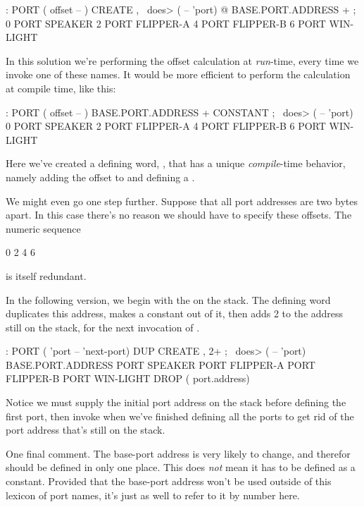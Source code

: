\begin{Code}
: PORT  ( offset -- )  CREATE ,
   \ does>  ( -- 'port) @ BASE.PORT.ADDRESS + ;
0 PORT SPEAKER
2 PORT FLIPPER-A
4 PORT FLIPPER-B
6 PORT WIN-LIGHT
\end{Code}
In this solution we're performing the offset calculation at
\emph{run}-time, every time we invoke one of these names. It would be
more efficient to perform the calculation at compile time, like this:

\begin{Code}
: PORT  ( offset -- )  BASE.PORT.ADDRESS + CONSTANT ;
   \ does>  ( -- 'port)
0 PORT SPEAKER
2 PORT FLIPPER-A
4 PORT FLIPPER-B
6 PORT WIN-LIGHT
\end{Code}
Here we've created a defining word, , that has a unique
\emph{compile}-time behavior, namely adding the offset to
 and defining a .

We might even go one step further. Suppose that all port addresses are
two bytes apart. In this case there's no reason we should have to
specify these offsets. The numeric sequence

\medskip

0 2 4 6

\medskip

\noindent
is itself redundant.

In the following version, we begin with the 
on the stack. The defining word  duplicates this address,
makes a constant out of it, then adds 2 to the address still on the
stack, for the next invocation of .

\begin{Code}
: PORT   ( 'port -- 'next-port)  DUP CREATE ,  2+ ;
   \ does>  ( -- 'port)
BASE.PORT.ADDRESS
  PORT SPEAKER
  PORT FLIPPER-A
  PORT FLIPPER-B
  PORT WIN-LIGHT
DROP ( port.address)
\end{Code}
Notice we must supply the initial port address on the stack before
defining the first port, then invoke  when we've finished
defining all the ports to get rid of the port address that's still on
the stack.

One final comment. The base-port address is very likely to change, and
therefor should be defined in only one place. This does \emph{not}
mean it has to be defined as a constant. Provided that the base-port
address won't be used outside of this lexicon of port names, it's just
as well to refer to it by number here.

